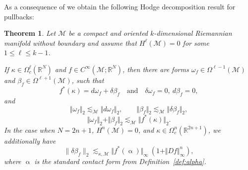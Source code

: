 \documentclass[intlimits,12pt,reqno]{amsart}
\newcommand{\cM}{\mathcal M}
\newcommand{\R}{\mathbb R}
\numberwithin{equation}{section}
\newtheorem{theorem}{Theorem}[section]
\theoremstyle{definition}
\newcommand{\brac}[1]{\left ( #1 \right )}
\begin{document}
As a consequence of   we obtain the following Hodge decomposition result for pullbacks:
\begin{theorem}
\label{th:hodgepullback}
Let $\cM$ be a compact and oriented $k$-dimensional Riemannian manifold without boundary and assume that
$H^\ell(\mathcal{M})=0$ for some $1 \leq \ell \leq k-1$. 

If $\kappa \in\Omega_c^\ell(\R^N)$ and $f \in C^\infty(\mathcal{M};\R^N)$, then there are forms
$\omega_f\in\Omega^{\ell-1}(\cM)$ and $\beta_f\in\Omega^{\ell+1}(\cM)$, such that
\begin{equation}
\label{eq146}
f^\ast(\kappa) = d\omega_f + \delta \beta_f 
\quad 
\text{and}
\quad
\delta\omega_f=0,\ d\beta_f=0,
\end{equation}
and
\begin{equation}
\label{eq159}
\Vert\omega_f\Vert_2\lesssim_\cM\Vert d\omega_f\Vert_2,
\qquad
\Vert\beta_f\Vert_2\lesssim_\cM\Vert\delta\beta_f\Vert_2,
\end{equation}
\begin{equation}
\label{eq151}
\Vert\omega_f\Vert_2+\Vert\beta_f\Vert_2\lesssim_\cM \Vert f^*(\kappa)\Vert_2.
\end{equation}
In the case when $N = 2n+1$, $H^n(\cM)=0$, and $\kappa \in\Omega_c^n(\R^{2n+1})$, we additionally have
\begin{equation}
\label{eq160}
 \|\delta \beta_f\|_{2} \lesssim_{\kappa,\cM} \Vert f^\ast(\upalpha)\Vert_{\infty}\ \brac{1+\Vert Df\Vert_{\infty}^{n}},
\end{equation}
where $\upalpha$ is the standard contact form from Definition~\ref{def:alpha}. 
\end{theorem}
\end{document}
